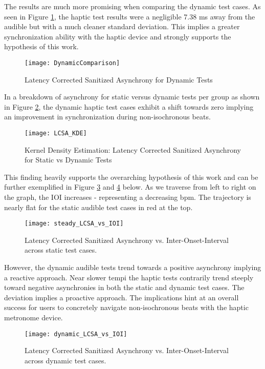 The results are much more promising when comparing the dynamic test cases. As seen in Figure \ref{fig:DynamicComparison}, the haptic test results were a negligible 7.38 ms away from the audible but with a much cleaner standard deviation. This implies a greater synchronization ability with the haptic device and strongly supports the hypothesis of this work.

\begin{figure}[H]
    \centering
    \texttt{[image: DynamicComparison]}
    \caption{Latency Corrected Sanitized Asynchrony for Dynamic Tests}
    \label{fig:DynamicComparison}
\end{figure}

In a breakdown of asynchrony for static versus dynamic tests per group as shown in Figure \ref{fig:LCSA_KDE}, the dynamic haptic test cases exhibit a shift towards zero implying an improvement in synchronization during non-isochronous beats.   
\begin{figure}[H]
    \centering
    \texttt{[image: LCSA\_KDE]}
    \caption{Kernel Density Estimation: Latency Corrected Sanitized Asynchrony for Static vs Dynamic Tests}
    \label{fig:LCSA_KDE}
\end{figure}This finding heavily supports the overarching hypothesis of this work and can be further exemplified in Figure \ref{fig:sLCSAvIOI} and \ref{fig:dLCSAvIOI} below. As we traverse from left to right on the graph, the IOI increases - representing a decreasing bpm. The trajectory is nearly flat for the static audible test cases in red at the top. 
\begin{figure}[H]
    \centering
    \texttt{[image: steady\_LCSA\_vs\_IOI]}
    \caption{Latency Corrected Sanitized Asynchrony vs. Inter-Onset-Interval across static test cases.}
    \label{fig:sLCSAvIOI}
\end{figure}
However, the dynamic audible tests trend towards a positive asynchrony implying a reactive approach. Near slower tempi the haptic tests contrarily trend steeply toward negative asynchronies in both the static and dynamic test cases. The deviation implies a proactive approach. The implications hint at an overall success for users to concretely navigate non-isochronous beats with the haptic metronome device. 
\begin{figure}[H]
    \centering
    \texttt{[image: dynamic\_LCSA\_vs\_IOI]}
    \caption{Latency Corrected Sanitized Asynchrony vs. Inter-Onset-Interval across dynamic test cases.}
    \label{fig:dLCSAvIOI}
\end{figure}

